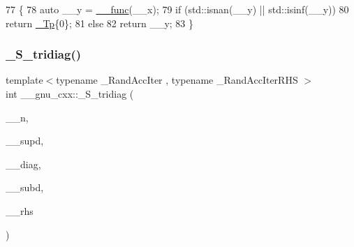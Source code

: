 \begin{DoxyCode}
77     \{
78       \textcolor{keyword}{auto} \_\_y = \hyperlink{namespace____gnu__cxx_af2b2f0c7a2ae72b922b1afefae5a65b2}{\_\_func}(\_\_x);
79       \textcolor{keywordflow}{if} (std::isnan(\_\_y) || std::isinf(\_\_y))
80         \textcolor{keywordflow}{return} \hyperlink{namespace____gnu__cxx_a3b19a9c800ca194374ef9172290f7d79}{\_Tp}\{0\};
81       \textcolor{keywordflow}{else}
82         \textcolor{keywordflow}{return} \_\_y;
83     \}
\end{DoxyCode}
\mbox{\label{namespace____gnu__cxx_a949fff28dbde67178a926d5d11114ebd}} 
\subsubsection{\texorpdfstring{\+\_\+\+S\+\_\+tridiag()}{\_S\_tridiag()}\hspace{0.1cm}{\footnotesize\ttfamily [1/2]}}
{\footnotesize\ttfamily template$<$typename \+\_\+\+Rand\+Acc\+Iter , typename \+\_\+\+Rand\+Acc\+Iter\+R\+HS $>$ \\
int \+\_\+\+\_\+gnu\+\_\+cxx\+::\+\_\+\+S\+\_\+tridiag (\begin{DoxyParamCaption}\item[{std\+::size\+\_\+t}]{\+\_\+\+\_\+n,  }\item[{\+\_\+\+Rand\+Acc\+Iter}]{\+\_\+\+\_\+supd,  }\item[{\+\_\+\+Rand\+Acc\+Iter}]{\+\_\+\+\_\+diag,  }\item[{\+\_\+\+Rand\+Acc\+Iter}]{\+\_\+\+\_\+subd,  }\item[{\+\_\+\+Rand\+Acc\+Iter\+R\+HS}]{\+\_\+\+\_\+rhs }\end{DoxyParamCaption})}

\mbox{\label{namespace____gnu__cxx_a4e853338765c8d1dc659feedb9813e2a}} 
